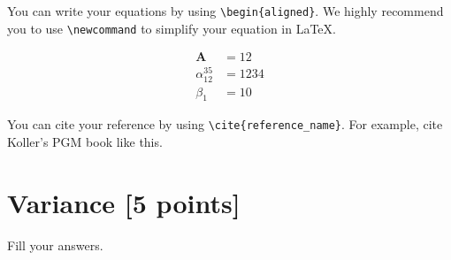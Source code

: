 \documentclass[12pt,a4paper]{article}
\newcommand{\Ab}{\bm{A}}
\begin{document}
You can write your equations by using \verb|\begin{aligned}|.
We highly recommend you to use \verb|\newcommand| to simplify your equation in \LaTeX.

$$
\begin{aligned}
    \Ab &= 12 \\
    \alpha_{12}^{35} &= 1234 \\
    \beta_1 &= 10
\end{aligned}
$$

You can cite your reference by using \verb|\cite{reference_name}|.
For example, cite Koller's PGM book \cite{KollerPGM} like this.


\section{Variance [5 points]}

Fill your answers.



\end{document}
